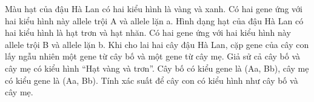 \begin{practice}
\begin{questions}[resume=SBT]
        \item Màu hạt của đậu Hà Lan có hai kiểu hình là vàng và xanh. Có hai gene ứng với hai kiểu hình này allele trội A và allele lặn a. Hình dạng hạt của đậu Hà Lan có hai kiểu hình là hạt trơn và hạt nhăn. Có hai gene ứng với hai kiểu hình này allele trội B và allele lặn b. Khi cho lai hai cây đậu Hà Lan, cặp gene của cây con lấy ngẫu nhiên một gene từ cây bố và một gene từ cây mẹ. Giả sử cả cây bố và cây mẹ có kiểu hình “Hạt vàng và trơn”. Cây bố có kiểu gene là (Aa, Bb), cây mẹ có kiểu gene là (Aa, Bb). Tính xác suất để cây con có kiểu hình như cây bố và cây mẹ.
        \answerline
        \answerline
        \answerline
    \end{questions}
\end{practice}

